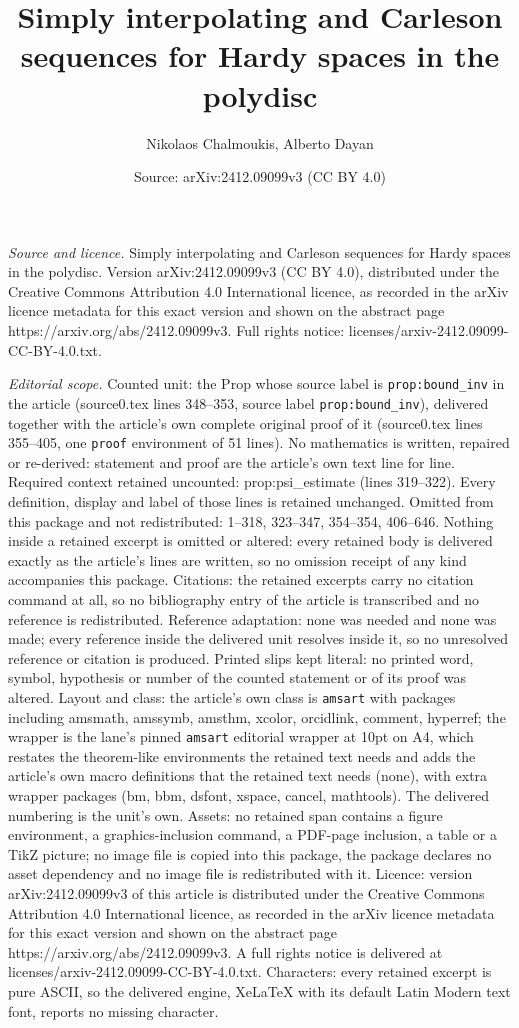 \documentclass[10pt,a4paper]{amsart}
\title[Simply interpolating and Carleson sequences for Hardy spaces]{Simply interpolating and Carleson sequences for Hardy spaces in the polydisc}
\author{Nikolaos Chalmoukis, Alberto Dayan}
\date{Source: arXiv:2412.09099v3 (CC BY 4.0)}
\begin{document}
\maketitle

\noindent\emph{Source and licence.} Simply interpolating and Carleson sequences for Hardy spaces in the polydisc. Version arXiv:2412.09099v3 (CC BY 4.0), distributed under the Creative Commons Attribution 4.0 International licence, as recorded in the arXiv licence metadata for this exact version and shown on the abstract page https://arxiv.org/abs/2412.09099v3. Full rights notice: licenses/arxiv-2412.09099-CC-BY-4.0.txt.\par\smallskip

\noindent\textit{Editorial scope.} Counted unit: the Prop whose source label is \texttt{prop:bound\_inv} in the article (source0.tex lines 348--353, source label \texttt{prop:bound\_inv}), delivered together with the article's own complete original proof of it (source0.tex lines 355--405, one \texttt{proof} environment of 51 lines). No mathematics is written, repaired or re-derived: statement and proof are the article's own text line for line. Required context retained uncounted: prop:psi\_estimate (lines 319--322). Every definition, display and label of those lines is retained unchanged. Omitted from this package and not redistributed: 1--318, 323--347, 354--354, 406--646. Nothing inside a retained excerpt is omitted or altered: every retained body is delivered exactly as the article's lines are written, so no omission receipt of any kind accompanies this package. Citations: the retained excerpts carry no citation command at all, so no bibliography entry of the article is transcribed and no reference is redistributed. Reference adaptation: none was needed and none was made; every reference inside the delivered unit resolves inside it, so no unresolved reference or citation is produced. Printed slips kept literal: no printed word, symbol, hypothesis or number of the counted statement or of its proof was altered. Layout and class: the article's own class is \texttt{amsart} with packages including amsmath, amssymb, amsthm, xcolor, orcidlink, comment, hyperref; the wrapper is the lane's pinned \texttt{amsart} editorial wrapper at 10pt on A4, which restates the theorem-like environments the retained text needs and adds the article's own macro definitions that the retained text needs (none), with extra wrapper packages (bm, bbm, dsfont, xspace, cancel, mathtools). The delivered numbering is the unit's own. Assets: no retained span contains a figure environment, a graphics-inclusion command, a PDF-page inclusion, a table or a TikZ picture; no image file is copied into this package, the package declares no asset dependency and no image file is redistributed with it. Licence: version arXiv:2412.09099v3 of this article is distributed under the Creative Commons Attribution 4.0 International licence, as recorded in the arXiv licence metadata for this exact version and shown on the abstract page https://arxiv.org/abs/2412.09099v3. A full rights notice is delivered at licenses/arxiv-2412.09099-CC-BY-4.0.txt. Characters: every retained excerpt is pure ASCII, so the delivered engine, XeLaTeX with its default Latin Modern text font, reports no missing character.
\end{document}
